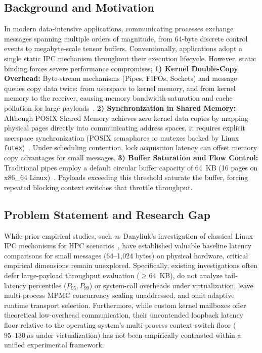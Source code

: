 \subsection{Background and Motivation}
In modern data-intensive applications, communicating processes exchange messages spanning multiple orders of magnitude, from 64-byte discrete control events to megabyte-scale tensor buffers. Conventionally, applications adopt a single static IPC mechanism throughout their execution lifecycle. However, static binding forces severe performance compromises:
\textbf{1) Kernel Double-Copy Overhead:} Byte-stream mechanisms (Pipes, FIFOs, Sockets) and message queues copy data twice: from userspace to kernel memory, and from kernel memory to the receiver, causing memory bandwidth saturation and cache pollution for large payloads~\cite{drepper2007every}.
\textbf{2) Synchronization in Shared Memory:} Although POSIX Shared Memory achieves zero kernel data copies by mapping physical pages directly into communicating address spaces, it requires explicit userspace synchronization (POSIX semaphores or mutexes backed by Linux \texttt{futex})~\cite{franke2002futex}. Under scheduling contention, lock acquisition latency can offset memory copy advantages for small messages.
\textbf{3) Buffer Saturation and Flow Control:} Traditional pipes employ a default circular buffer capacity of 64~KB (16 pages on x86\_64 Linux)~\cite{bovet2005understanding}. Payloads exceeding this threshold saturate the buffer, forcing repeated blocking context switches that throttle throughput.

\subsection{Problem Statement and Research Gap}
While prior empirical studies, such as Danyliuk's investigation of classical Linux IPC mechanisms for HPC scenarios~\cite{danyliuk2026classical}, have established valuable baseline latency comparisons for small messages (64--1,024 bytes) on physical hardware, critical empirical dimensions remain unexplored. Specifically, existing investigations often defer large-payload throughput evaluation ($\ge 64$~KB), do not analyze tail-latency percentiles ($P_{95}, P_{99}$) or system-call overheads under virtualization, leave multi-process MPMC concurrency scaling unaddressed, and omit adaptive runtime transport selection. Furthermore, while custom kernel mailboxes offer theoretical low-overhead communication, their uncontended loopback latency floor relative to the operating system's multi-process context-switch floor ($95\text{--}130\,\mu\text{s}$ under virtualization) has not been empirically contrasted within a unified experimental framework.

